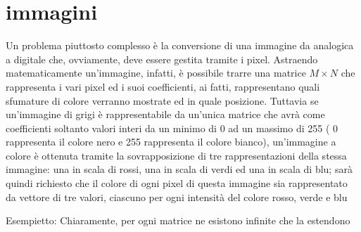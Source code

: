 \chapter{immagini}
Un problema piuttosto complesso è la conversione di una immagine da analogica a digitale che, ovviamente, deve essere gestita tramite i pixel. Astraendo matematicamente un'immagine, infatti, è possibile trarre una matrice $M\times N$ che rappresenta i vari pixel ed i suoi coefficienti, ai fatti, rappresentano quali sfumature di colore verranno mostrate ed in quale posizione. Tuttavia se un'immagine di grigi è rappresentabile da un'unica matrice che avrà come coefficienti soltanto valori interi da un minimo di 0 ad un massimo di
255 ( 0 rappresenta il colore nero e 255 rappresenta il colore bianco), un'immagine a colore è ottenuta tramite la sovrapposizione di tre rappresentazioni della stessa immagine: una in scala di rossi, una in scala di verdi ed una in scala di blu; sarà quindi richiesto che il colore di ogni pixel di questa immagine sia rappresentato da vettore di tre valori, ciascuno per ogni intensità del colore rosso, verde e blu


Esempietto:
Chiaramente, per ogni matrice ne esistono infinite che la estendono

